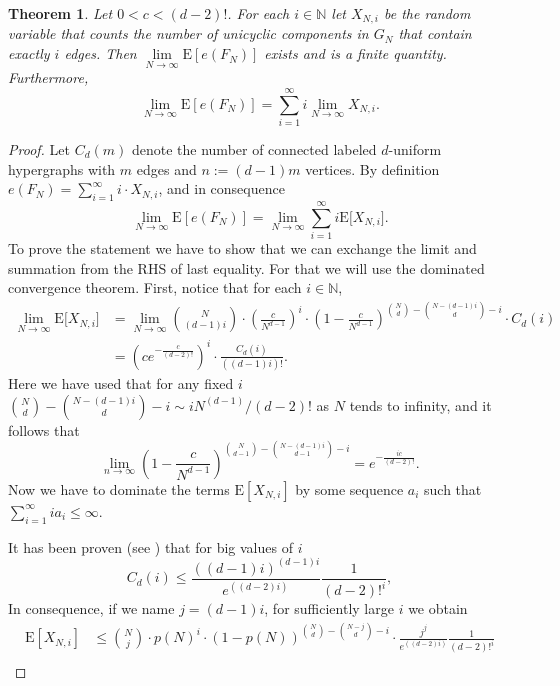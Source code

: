 \documentclass[11pt,notitlepage,a4paper]{article}
\newtheorem{theorem}{Theorem}[section]
\theoremstyle{definition}
\newcommand{\N}{\mathbb{N}}
\newcommand{\Ln}{\lim\limits_{n\to \infty}}
\newcommand{\LN}{\lim\limits_{N\to \infty}}
\begin{document}
\begin{theorem} \label{thm:sizefragment}
	Let $0<c<(d-2)!$. For each $i\in \N$ let
	$X_{N,i}$ be the random variable that
	counts the number of unicyclic components 
	in $G_N$ that contain exactly $i$ edges.
	Then $\LN \mathrm{E}[e(F_N)]$  
	exists and is a finite quantity. Furthermore,
	\[
	\LN \mathrm{E}[e(F_N)]=\sum_{i=1}^\infty i \LN X_{N,i}.
	\]
\end{theorem}
\begin{proof}
	Let $C_d(m)$ denote the number of connected labeled $d$-uniform
	hypergraphs with $m$ edges and $n:=(d-1)m$ vertices. 
	By definition $e(F_N) =\sum_{i=1}^{\infty} i \cdot X_{N,i}$, and
	in consequence 
	\[
	\LN \mathrm{E}[e(F_N)]=\LN \sum_{i=1}^\infty i 
	\mathrm{E}\big[ X_{N,i}\big].
	\]
	To prove the statement we have to show that we can 
	exchange the limit and summation from the RHS of last equality.
	For that we will use the dominated convergence theorem. 
	First, notice that for each $i\in \N$,
	\begin{align*}
	\LN	\mathrm{E}\big[X_{N,i}\big]&=
	\LN \binom{N}{(d-1)i}\cdot\left(\frac{c}{N^{d-1}}\right)^i
	\cdot\left(1- \frac{c}{N^{d-1}}\right)^{\binom{N}{d}-
	\binom{N-(d-1)i}{d} - i}\cdot C_d(i)\\
	&=\left(c e^{-\frac{c}{(d-2)!}}\right)^i\cdot 
	\frac{C_d(i)}{((d-1)i)!}.
	\end{align*}
	Here we have used that
	for any fixed $i$ $\binom{N}{d}-
	\binom{N-(d-1)i}{d} - i\sim i N^{(d-1)}/(d-2)!$ as
	$N$ tends to infinity, and it follows that
	\[
	\Ln \left(1- \frac{c}{N^{d-1}}\right)^{\binom{N}{d-1}-
	\binom{N-(d-1)i}{d-1} - i} =
	e^{-\frac{ic}{(d-2)!}}.
	\]
	Now we have to dominate the terms $\mathrm{E}[X_{N,i}]$
	by some sequence $a_i$ such that $\sum_{i=1}^\infty ia_i\leq\infty$.\par
	It has been 
	proven (see \cite{karonski2002phase}) 
	that for big values of $i$
	\[C_d(i)\leq \frac{((d-1)i)^{(d-1)i}}{e^{((d-2)i)}}\frac{1}{(d-2)!^i},\]
	In consequence, if we name $j=(d-1)i$, for sufficiently large $i$ we
	obtain
	\begin{align}
	\nonumber \mathrm{E}[X_{N,i}] & \leq 
	\binom{N}{j}\cdot p(N)^{i}\cdot
	(1-p(N))^{\binom{N}{d}-\binom{N-j}{d} - i}
	\cdot\frac{{j}^{j}}{e^{((d-2)i)}}\frac{1}{(d-2)!^i}\\ 

\end{align}
\end{proof}
\end{document}
